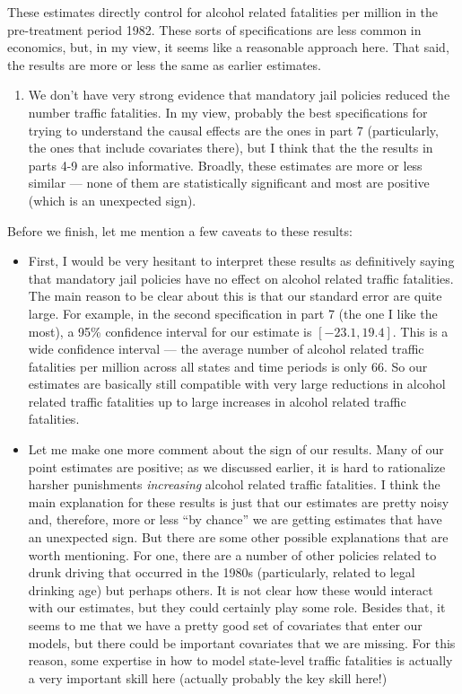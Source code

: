 \documentclass[
  letterpaper,
  DIV=11,
  numbers=noendperiod]{scrreprt}
\providecommand{\tightlist}{%
  \setlength{\itemsep}{0pt}\setlength{\parskip}{0pt}}\usepackage{longtable,booktabs,array}
\begin{document}
These estimates directly control for alcohol related fatalities per
million in the pre-treatment period 1982. These sorts of specifications
are less common in economics, but, in my view, it seems like a
reasonable approach here. That said, the results are more or less the
same as earlier estimates.

\begin{enumerate}
\def\labelenumi{\arabic{enumi}.}
\setcounter{enumi}{9}
\tightlist
\item
  We don't have very strong evidence that mandatory jail policies
  reduced the number traffic fatalities. In my view, probably the best
  specifications for trying to understand the causal effects are the
  ones in part 7 (particularly, the ones that include covariates there),
  but I think that the the results in parts 4-9 are also informative.
  Broadly, these estimates are more or less similar --- none of them are
  statistically significant and most are positive (which is an
  unexpected sign).
\end{enumerate}

Before we finish, let me mention a few caveats to these results:

\begin{itemize}
\item
  First, I would be very hesitant to interpret these results as
  definitively saying that mandatory jail policies have no effect on
  alcohol related traffic fatalities. The main reason to be clear about
  this is that our standard error are quite large. For example, in the
  second specification in part 7 (the one I like the most), a 95\%
  confidence interval for our estimate is \([-23.1, 19.4]\). This is a
  wide confidence interval --- the average number of alcohol related
  traffic fatalities per million across all states and time periods is
  only 66. So our estimates are basically still compatible with very
  large reductions in alcohol related traffic fatalities up to large
  increases in alcohol related traffic fatalities.
\item
  Let me make one more comment about the sign of our results. Many of
  our point estimates are positive; as we discussed earlier, it is hard
  to rationalize harsher punishments \emph{increasing} alcohol related
  traffic fatalities. I think the main explanation for these results is
  just that our estimates are pretty noisy and, therefore, more or less
  ``by chance'' we are getting estimates that have an unexpected sign.
  But there are some other possible explanations that are worth
  mentioning. For one, there are a number of other policies related to
  drunk driving that occurred in the 1980s (particularly, related to
  legal drinking age) but perhaps others. It is not clear how these
  would interact with our estimates, but they could certainly play some
  role. Besides that, it seems to me that we have a pretty good set of
  covariates that enter our models, but there could be important
  covariates that we are missing. For this reason, some expertise in how
  to model state-level traffic fatalities is actually a very important
  skill here (actually probably the key skill here!)
\end{itemize}
\end{document}
